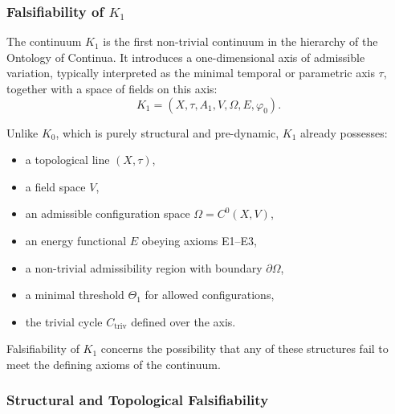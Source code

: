 
\subsubsection{Falsifiability of \texorpdfstring{$K_1$}{K_1}}
\label{sec:falsifiability-k1}

The continuum $K_1$ is the first non-trivial continuum in the hierarchy
of the Ontology of Continua.  
It introduces a one-dimensional axis of admissible variation,
typically interpreted as the minimal temporal or parametric axis $\tau$,
together with a space of fields on this axis:
\[
K_1 = (X,\tau, A_1, V, \Omega, E, \varphi_0).
\]

Unlike $K_0$, which is purely structural and pre-dynamic, $K_1$ already
possesses:
\begin{itemize}
    \item a topological line $(X,\tau)$,
    \item a field space $V$,
    \item an admissible configuration space $\Omega=C^{0}(X,V)$,
    \item an energy functional $E$ obeying axioms E1–E3,
    \item a non-trivial admissibility region with boundary $\partial\Omega$,
    \item a minimal threshold $\Theta_1$ for allowed configurations,
    \item the trivial cycle $C_{\mathrm{triv}}$ defined over the axis.
\end{itemize}

Falsifiability of $K_1$ concerns the possibility that any of these
structures fail to meet the defining axioms of the continuum.



\subsubsection{Structural and Topological Falsifiability}

